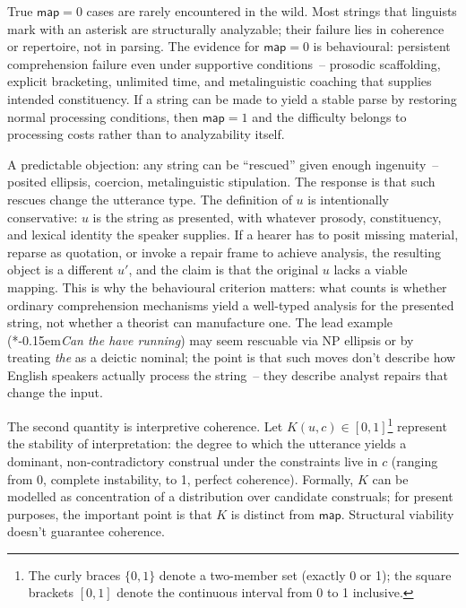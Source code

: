 \documentclass[12pt,letterpaper]{article}
\newcommand{\mention}[1]{\textit{#1}}
\newcommand{\judgesep}{\kern-0.15em}
\newcommand{\ungram}[1]{*\judgesep#1}
\begin{document}
True $\mathsf{map}=0$ cases are rarely encountered in the wild. Most strings that linguists mark with an asterisk are structurally analyzable; their failure lies in coherence or repertoire, not in parsing. The evidence for $\mathsf{map}=0$ is behavioural: persistent comprehension failure even under supportive conditions~-- prosodic scaffolding, explicit bracketing, unlimited time, and metalinguistic coaching that supplies intended constituency. If a string can be made to yield a stable parse by restoring normal processing conditions, then $\mathsf{map}=1$ and the difficulty belongs to processing costs rather than to analyzability itself.

A predictable objection: any string can be \enquote{rescued} given enough ingenuity~-- posited ellipsis, coercion, metalinguistic stipulation. The response is that such rescues change the utterance type. The definition of $u$ is intentionally conservative: $u$ is the string as presented, with whatever prosody, constituency, and lexical identity the speaker supplies. If a hearer has to posit missing material, reparse as quotation, or invoke a repair frame to achieve analysis, the resulting object is a different $u'$, and the claim is that the original $u$ lacks a viable mapping. This is why the behavioural criterion matters: what counts is whether ordinary comprehension mechanisms yield a well-typed analysis for the presented string, not whether a theorist can manufacture one. The lead example (\ungram{\mention{Can the have running}}) may seem rescuable via NP ellipsis or by treating \mention{the} as a deictic nominal; the point is that such moves don't describe how English speakers actually process the string~-- they describe analyst repairs that change the input.

The second quantity is interpretive coherence. Let $K(u,c)\in[0,1]$\footnote{The curly braces $\{0,1\}$ denote a two-member set (exactly 0 or 1); the square brackets $[0,1]$ denote the continuous interval from 0 to 1 inclusive.} represent the stability of interpretation: the degree to which the utterance yields a dominant, non-contradictory construal under the constraints live in $c$ (ranging from 0, complete instability, to 1, perfect coherence). Formally, $K$ can be modelled as concentration of a distribution over candidate construals; for present purposes, the important point is that $K$ is distinct from $\mathsf{map}$. Structural viability doesn't guarantee coherence.
\end{document}
